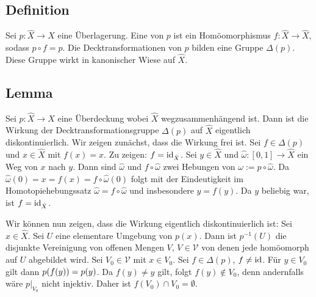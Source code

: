 \subsection[Definition: Decktransformation]{Definition} %
\label{sub:12.6}
Sei $p : \hat{X} \to X$ eine Überlagerung. Eine  von $p$ ist ein Homöomorphismus $f : \hat{X} \to \hat{X}$, sodass $p \circ f = p$. Die 
Decktransformationen von $p$ bilden eine Gruppe $\Delta(p)$. Diese Gruppe wirkt in kanonischer Wiese auf $\hat{X}$.

\subsection[Lemma: $\Delta(p)$ wirkt eigentlich diskontinuierlich auf $\hat{X}$]{Lemma} %
\label{sub:12.7}
Sei $p : \hat{X} \to X$ eine Überdeckung wobei $\hat{X}$ wegzusammenhängend ist. Dann ist die Wirkung der Decktransformationsgruppe $\Delta(p)$ auf $\hat{X}$ eigentlich
diskontinuierlich.
Wir zeigen zunächst, dass die Wirkung frei ist. Sei $f \in \Delta(p)$ und $x \in \hat{X}$ mit $f(x) = x$. Zu zeigen: $f =\operatorname{id}_{\hat{X}}$.
Sei $y \in \hat{X}$ und $\hat{\omega} : [0,1] \to \hat{X}$ ein
Weg von $x$ nach $y$. Dann sind $\hat{\omega}$ und $f \circ \hat{\omega}$ zwei Hebungen von $\omega := p \circ \hat{\omega}$. Da 
$\hat{\omega}(0) = x = f(x) = f \circ \hat{\omega}(0)$ folgt mit der Eindeutigkeit im Homotopiehebungssatz $\hat{\omega} = f \circ \hat{\omega}$ und insbesondere $y=f(y)$.
Da $y$ beliebig war, ist $f= \operatorname{id}_{\hat{X}}$.

Wir können nun zeigen, dass die Wirkung eigentlich diskontinuierlich ist: Sei $x \in \hat{X}$. Sei $U$ eine elementare Umgebung von $p(x)$. Dann ist $p ^{-1}(U)$ die 
disjunkte Vereinigung von offenen Mengen $V$, $V \in \mathcal{V}$ von denen jede homöomorph auf $U$ abgebildet wird. Sei $V_0 \in \mathcal{V}$ mit $x \in V_0$. Sei 
$f \in \Delta(p)$, $f \not= \operatorname{id}$. Für $y \in V_0$ gilt dann $p \enbrace*{f(y)} = p(y) $. Da $f(y) \not=y$ gilt, folgt $f(y) \not\in V_0$, denn andernfalls wäre 
$p\big|_{V_0}$ nicht injektiv. Daher ist $f(V_0) \cap V_0 = \emptyset$. \bewende

